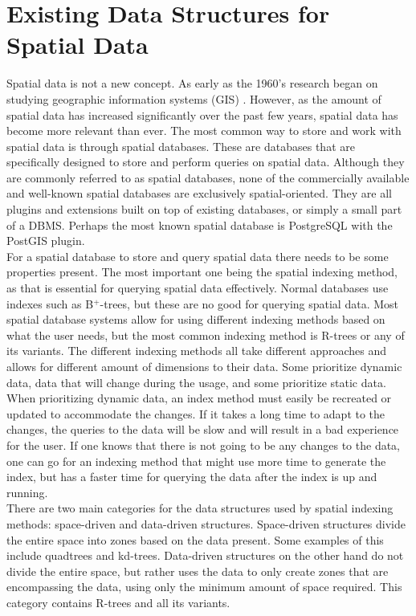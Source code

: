 \section{Existing Data Structures for Spatial Data}\label{sec:data_structures}
Spatial data is not a new concept. As early as the 1960's research began on studying geographic information systems (GIS) \cite{history_gis}. However, as the amount of spatial data has increased significantly over the past few years, spatial data has become more relevant than ever. The most common way to store and work with spatial data is through spatial databases. These are databases that are specifically designed to store and perform queries on spatial data. Although they are commonly referred to as spatial databases, none of the commercially available and well-known spatial databases are exclusively spatial-oriented. They are all plugins and extensions built on top of existing databases, or simply a small part of a DBMS. Perhaps the most known spatial database is PostgreSQL with the PostGIS plugin. \\

For a spatial database to store and query spatial data there needs to be some properties present. The most important one being the spatial indexing method, as that is essential for querying spatial data effectively. Normal databases use indexes such as B$^{+}$-trees, but these are no good for querying spatial data. Most spatial database systems allow for using different indexing methods based on what the user needs, but the most common indexing method is R-trees or any of its variants. The different indexing methods all take different approaches and allows for different amount of dimensions to their data. Some prioritize dynamic data, data that will change during the usage, and some prioritize static data. When prioritizing dynamic data, an index method must easily be recreated or updated to accommodate the changes. If it takes a long time to adapt to the changes, the queries to the data will be slow and will result in a bad experience for the user. If one knows that there is not going to be any changes to the data, one can go for an indexing method that might use more time to generate the index, but has a faster time for querying the data after the index is up and running. \\

There are two main categories for the data structures used by spatial indexing methods: space-driven and data-driven structures. Space-driven structures divide the entire space into zones based on the data present. Some examples of this include quadtrees and kd-trees. Data-driven structures on the other hand do not divide the entire space, but rather uses the data to only create zones that are encompassing the data, using only the minimum amount of space required. This category contains R-trees and all its variants. \\

